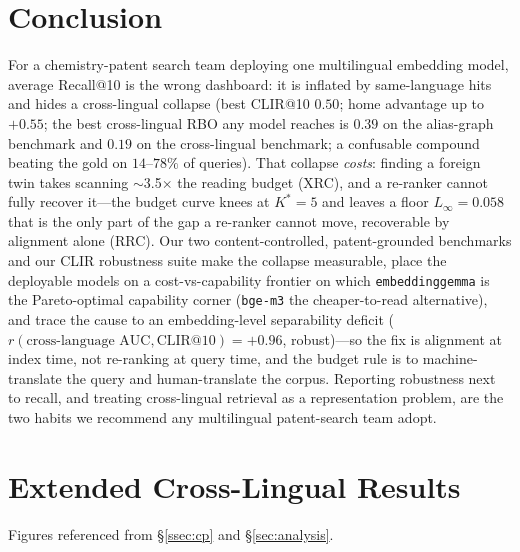 \documentclass[11pt]{article}
\begin{document}
\section{Conclusion}

For a chemistry-patent search team deploying one multilingual embedding model,
average Recall@10 is the wrong dashboard: it is inflated by same-language hits
and hides a cross-lingual collapse (best CLIR@10 $0.50$; home advantage up to
$+0.55$; the best cross-lingual RBO any model reaches is $0.39$ on the
alias-graph benchmark and $0.19$ on the cross-lingual benchmark; a confusable
compound beating the gold on $14$--$78\%$ of queries). That collapse \emph{costs}:
finding a foreign twin takes scanning $\sim$3.5$\times$ the reading budget (XRC),
and a re-ranker cannot fully recover it---the budget curve knees at $K^{\!*}{=}5$
and leaves a floor $L_\infty=0.058$ that is the only part of the gap a re-ranker
cannot move, recoverable by alignment alone (RRC). Our two
content-controlled, patent-grounded benchmarks and our CLIR robustness suite make
the collapse measurable, place the deployable models on a cost-vs-capability
frontier on which \texttt{embeddinggemma} is the Pareto-optimal capability corner
(\texttt{bge-m3} the cheaper-to-read alternative), and trace the cause to an
embedding-level separability deficit
($r(\text{cross-language AUC},\text{CLIR@10})=+0.96$, robust)---so the fix is
alignment at index time, not re-ranking at query time, and the budget rule is to
machine-translate the query and human-translate the corpus. Reporting robustness
next to recall, and treating cross-lingual retrieval as a representation problem,
are the two habits we recommend any multilingual patent-search team adopt.



\appendix


\section{Extended Cross-Lingual Results}
\label{app:cp_extra}
Figures referenced from \S\ref{ssec:cp} and \S\ref{sec:analysis}.
\end{document}
